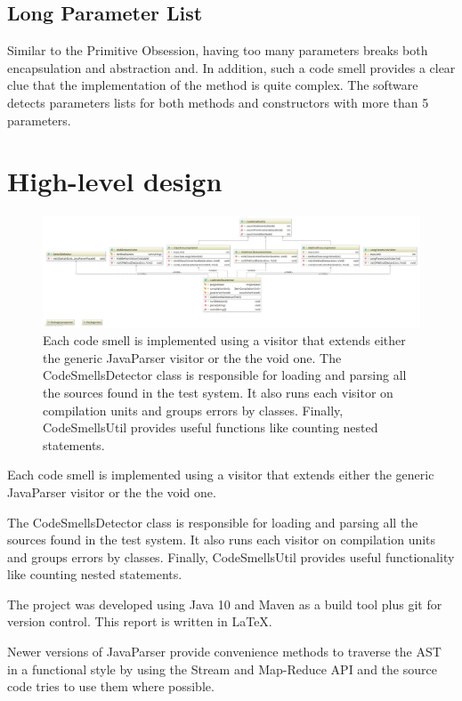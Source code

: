 \documentclass[a4paper]{article}
\begin{document}
\subsection{Long Parameter List}
Similar to the Primitive Obsession, having too many parameters breaks both
encapsulation and abstraction and.
In addition, such a code smell provides a clear clue that the implementation
of the method is quite complex.
The software detects parameters lists for both methods and constructors
with more than 5 parameters.

\section{High-level design}

\begin{figure}
	\includegraphics[width=\textwidth]{codesmellspng}
	\caption{Each code smell is implemented using a visitor that extends either
		the generic JavaParser visitor or the the void one.
		The CodeSmellsDetector class is responsible for loading and parsing all
		the sources found in the test system.
		It also runs each visitor on compilation units and
		groups errors by classes.
		Finally, CodeSmellsUtil provides useful functions like counting
		nested statements.}
\end{figure}

Each code smell is implemented using a visitor that extends either
the generic JavaParser visitor or the the void one.

The CodeSmellsDetector class is responsible for loading and parsing all
the sources found in the test system.
It also runs each visitor on compilation units and
groups errors by classes.
Finally, CodeSmellsUtil provides useful functionality like counting
nested statements.

The project was developed using Java 10 and Maven as a build tool plus git for
version control. This report is written in \LaTeX.

Newer versions of JavaParser provide convenience methods to traverse the AST
in a functional style by using the Stream and Map-Reduce API and the source
code tries to use them where possible.
\end{document}
